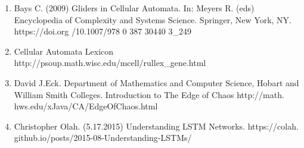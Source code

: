 \documentclass[12pt]{article}
\numberwithin{figure}{section} %
\begin{document}
\begin{enumerate}[topsep=0pt,itemsep=-1ex,partopsep=1ex,parsep=1ex]
\item Bays C. (2009) Gliders in Cellular Automata. In: Meyers R. (eds) Encyclopedia of Complexity and Systems Science. Springer, New York, NY. https://doi.org
\linebreak/10.1007/978 0 387 30440 3\_249
\item Cellular Automata Lexicon http://psoup.math.wisc.edu/mcell/rullex\_gene.html
\item David J.Eck. Department of Mathematics and Computer Science, Hobart and William Smith Colleges. Introduction to The Edge of Chaos http://math.\linebreak
hws.edu/xJava/CA/EdgeOfChaos.html
\item Christopher Olah. (5.17.2015) Understanding LSTM Networks. https://colah.\linebreak
github.io/posts/2015-08-Understanding-LSTMs/

\end{enumerate}
\fi
\end{document}
